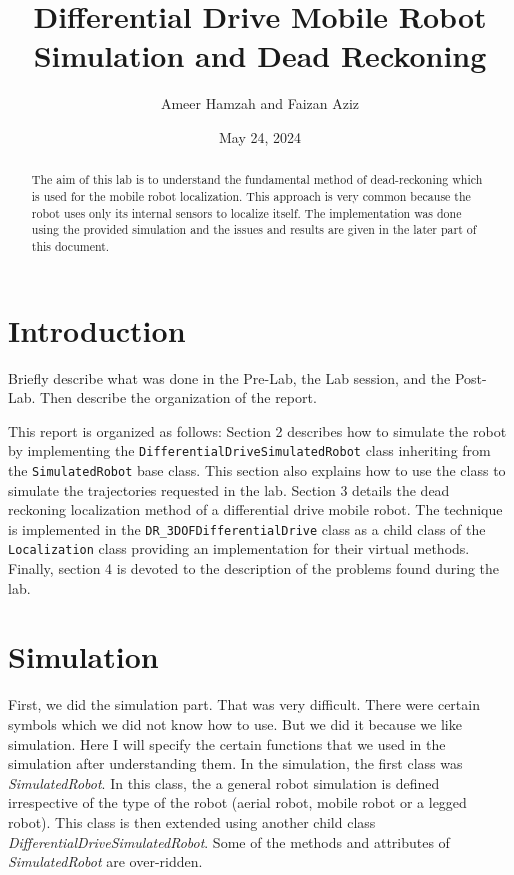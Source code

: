 \documentclass{article}
\begin{document}
\title{Differential Drive Mobile Robot Simulation and Dead Reckoning}
\author{Ameer Hamzah and Faizan Aziz}
\date{May 24, 2024}
\maketitle

\begin{abstract}
    The aim of this lab is to understand the fundamental method of dead-reckoning which is used for the mobile robot localization. This approach is very common because the robot uses only its internal sensors to localize itself. The implementation was done using the provided simulation and the issues and results are given in the later part of this document.
\end{abstract}

\section{Introduction}
Briefly describe what was done in the Pre-Lab, the Lab session, and the Post-Lab. Then describe the organization of the report.

This report is organized as follows: Section 2 describes how to simulate the robot by implementing the \texttt{DifferentialDriveSimulatedRobot} class inheriting from the \texttt{SimulatedRobot} base class. This section also explains how to use the class to simulate the trajectories requested in the lab. Section 3 details the dead reckoning localization method of a differential drive mobile robot. The technique is implemented in the \texttt{DR\_3DOFDifferentialDrive} class as a child class of the \texttt{Localization} class providing an implementation for their virtual methods. Finally, section 4 is devoted to the description of the problems found during the lab.

\section{Simulation}
First, we did the simulation part. That was very difficult. There were certain symbols which we did not know how to use. But we did it because we like simulation.
Here I will specify the certain functions that we used in the simulation after understanding them. In the simulation, the first class was \textit{SimulatedRobot}. In this class, the a general robot simulation is defined irrespective of the type of the robot (aerial robot, mobile robot or a legged robot). This class is then extended using another child class \textit{DifferentialDriveSimulatedRobot}. Some of the methods and attributes of \textit{SimulatedRobot} are over-ridden.
\end{document}
